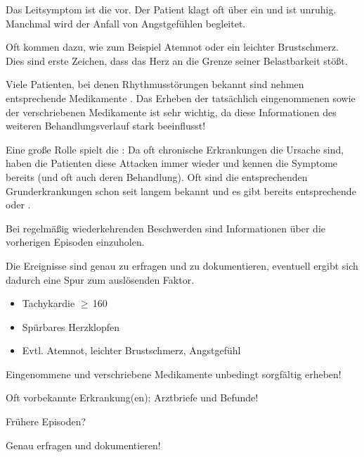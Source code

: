 {{\TxSAMPLE}}
{
\begin{SAMPLERText}
  \item[\SAMPLER{S}] Das Leitsymptom ist die  vor. 
  Der Patient
  klagt oft über ein  und ist unruhig. Manchmal wird der Anfall von
  Angstgefühlen begleitet.
  
  Oft kommen  dazu, wie zum Beispiel Atemnot oder ein
  leichter Brustschmerz. Dies sind erste Zeichen, dass das Herz an
  die Grenze seiner Belastbarkeit stößt.
  \item[\SAMPLER{M}] Viele Patienten, bei denen
  Rhythmusstörungen bekannt sind nehmen entsprechende
  Medikamente . 
  Das Erheben der tatsächlich eingenommenen sowie der verschriebenen Medikamente
  ist sehr wichtig, da diese Informationen des weiteren Behandlungsverlauf
  stark beeinflusst!
  \item[\SAMPLER{P}] Eine große Rolle spielt die : Da oft
  chronische Erkrankungen die Ursache sind, haben die
  Patienten diese Attacken immer wieder und kennen die
  Symptome bereits (und oft auch deren Behandlung). Oft sind die
  entsprechenden Grunderkrankungen schon seit langem bekannt und es 
  gibt bereits entsprechende  oder .
  \item[\SAMPLER{L}] Bei regelmäßig wiederkehrenden Beschwerden sind 
  Informationen über die vorherigen Episoden einzuholen.
  \item[\SAMPLER{E}] Die Ereignisse sind genau zu erfragen und zu
  dokumentieren, eventuell ergibt sich dadurch eine Spur zum auslösenden Faktor.
\end{SAMPLERText}
}
{
\begin{SAMPLERSlide}
  \item[\SAMPLER{S}]
  \begin{itemize}
    \item Tachykardie $\geq$\,160\PerMin*
    \item Spürbares Herzklopfen
    \item Evtl. Atemnot, leichter Brustschmerz, Angstgefühl
  \end{itemize}
  \item[\SAMPLER{M}]  Eingenommene und verschriebene Medikamente unbedingt sorgfältig erheben!
  \item[\SAMPLER{P}] Oft vorbekannte Erkrankung(en); Arztbriefe und Befunde!
  \item[\SAMPLER{L}] Frühere Episoden?
  \item[\SAMPLER{E}] Genau erfragen und dokumentieren!
\end{SAMPLERSlide}
}
{}
{}
{}



